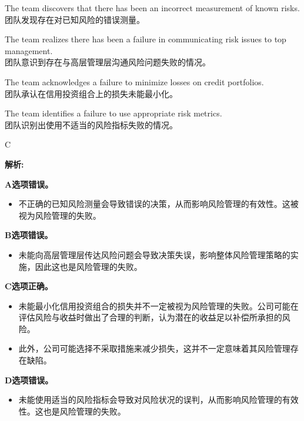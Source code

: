 \documentclass{article}
\newenvironment{explanation}
{\textbf{解析:}\par}
{\par}
\begin{document}
\begin{choices}
    \item The team discovers that there has been an incorrect measurement of known risks. \\
    团队发现存在对已知风险的错误测量。
    \item The team realizes there has been a failure in communicating risk issues to top management. \\
    团队意识到存在与高层管理层沟通风险问题失败的情况。
    \item The team acknowledges a failure to minimize losses on credit portfolios. \\
    团队承认在信用投资组合上的损失未能最小化。
    \item The team identifies a failure to use appropriate risk metrics. \\
    团队识别出使用不适当的风险指标失败的情况。
\end{choices}

\begin{correctanswer}
    C
\end{correctanswer}

\begin{explanation}
    \textbf{A选项错误。}
    \begin{itemize}
        \item 不正确的已知风险测量会导致错误的决策，从而影响风险管理的有效性。这被视为风险管理的失败。
    \end{itemize}
    
    \textbf{B选项错误。}
    \begin{itemize}
        \item 未能向高层管理层传达风险问题会导致决策失误，影响整体风险管理策略的实施，因此这也是风险管理的失败。
    \end{itemize}
    
    \textbf{C选项正确。}
    \begin{itemize}
        \item 未能最小化信用投资组合的损失并不一定被视为风险管理的失败。公司可能在评估风险与收益时做出了合理的判断，认为潜在的收益足以补偿所承担的风险。
        \item 此外，公司可能选择不采取措施来减少损失，这并不一定意味着其风险管理存在缺陷。
    \end{itemize}
    
    \textbf{D选项错误。}
    \begin{itemize}
        \item 未能使用适当的风险指标会导致对风险状况的误判，从而影响风险管理的有效性。这也是风险管理的失败。
    \end{itemize}
\end{explanation}
\end{document}
